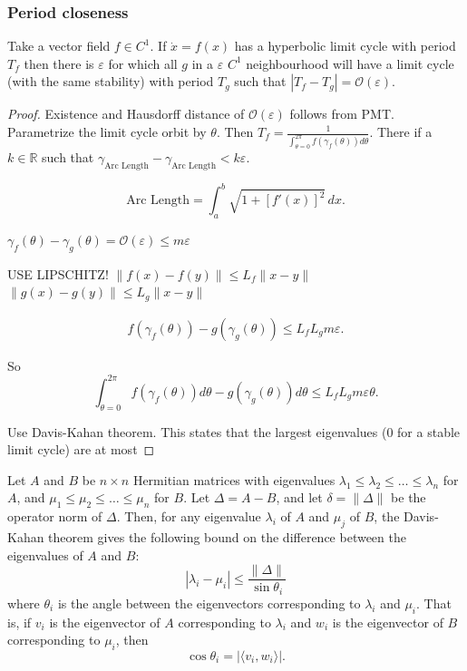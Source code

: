 \documentclass{article}
\newcommand{\reals}{\mathbb{R}}
\newcounter{ct}
\begin{document}
\subsubsection{Period closeness}\label{sec:periodcloseness}
\begin{proposition}\label{prop:periodcloseness}%
Take a vector field $f\in C^1$.
If $\dot x = f(x)$ has a hyperbolic limit cycle with period $T_f$ then there is $\varepsilon$ for which all $g$ in a $\varepsilon$ $C^1$ neighbourhood will have a limit cycle (with the same stability) with period $T_g$ such that  $|T_f-T_g| = \mathcal{O}(\varepsilon)$.
\end{proposition}

\begin{proof}
Existence and Hausdorff distance of $\mathcal{O}(\varepsilon)$ follows from PMT.
Parametrize the limit cycle orbit by $\theta$.
Then $T_f = \frac{1}{\int_{\theta=0}^{2\pi}f(\gamma_f(\theta))d\theta}$.
There if a $k\in\reals$ such that $\gamma_{\text{Arc Length}} - \gamma_{\text{Arc Length}}<k\varepsilon$.

\[\text{Arc Length} = \int_a^b \sqrt{1 + [f'(x)]^2} \, dx.\]

$\gamma_f(\theta)-\gamma_g(\theta) = \mathcal{O}(\varepsilon) \leq m\varepsilon$ %


USE LIPSCHITZ! 
$\|f(x)-f(y)\|\leq L_f\|x-y\|$
$\|g(x)-g(y)\|\leq L_g\|x-y\|$


\begin{align}
f(\gamma_f(\theta)) - g(\gamma_g(\theta)) \leq  L_fL_gm\varepsilon.
\end{align}

So \[\int_{\theta=0}^{2\pi}f(\gamma_f(\theta))d\theta-g(\gamma_g(\theta))d\theta\leq L_fL_gm\varepsilon\theta.\]


Use Davis-Kahan theorem. 
This states that the largest eigenvalues (0 for a stable limit cycle) are at most 
\end{proof}


\begin{theorem}
Let \( A \) and \( B \) be \( n \times n \) Hermitian matrices with eigenvalues \( \lambda_1 \leq \lambda_2 \leq \dots \leq \lambda_n \) for \( A \), and \( \mu_1 \leq \mu_2 \leq \dots \leq \mu_n \) for \( B \). Let \( \Delta = A - B \), and let \( \delta = \| \Delta \| \) be the operator norm of \( \Delta \). Then, for any eigenvalue \( \lambda_i \) of \( A \) and \( \mu_j \) of \( B \), the Davis-Kahan theorem gives the following bound on the difference between the eigenvalues of \( A \) and \( B \):
\[
|\lambda_i - \mu_i| \leq \frac{\| \Delta \|}{\sin \theta_i}
\]
where \( \theta_i \) is the angle between the eigenvectors corresponding to \( \lambda_i \) and \( \mu_i \). That is, if \( v_i \) is the eigenvector of \( A \) corresponding to \( \lambda_i \) and \( w_i \) is the eigenvector of \( B \) corresponding to \( \mu_i \), then
\[
\cos \theta_i = | \langle v_i, w_i \rangle |.
\]
\end{theorem}
\end{document}
